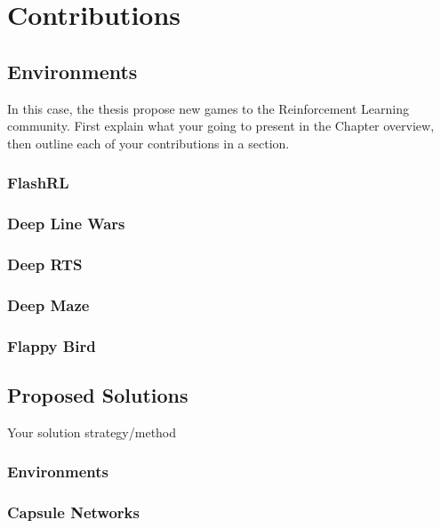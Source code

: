 \documentclass{uia}
\begin{document}
\part{Contributions}

\chapter{Environments}
\label{chap:env}
In this case, the thesis propose new games to the Reinforcement Learning community. First explain what your going to present in the Chapter overview, then outline each of your contributions in a section.

\section{FlashRL}
\label{sec:env:flashrl}

\section{Deep Line Wars}
\label{sec:env:deeplinewars}

\section{Deep RTS}
\label{sec:env:deeprts}

\section{Deep Maze}
\label{sec:env:maze}

\section{Flappy Bird}
\label{sec:env:flappybird}


\chapter{Proposed Solutions}
\label{chap:solutions}

Your solution strategy/method

\section{Environments}
\label{sec:solutions:environments}

\section{Capsule Networks}
\label{sec:solutions:capsnet}
\end{document}
